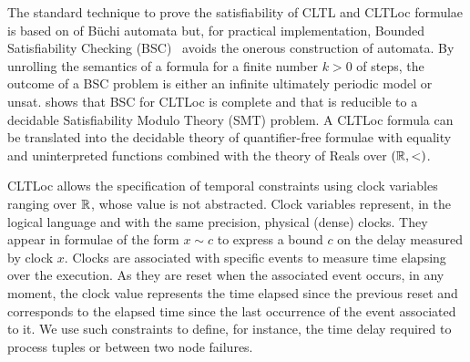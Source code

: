 The standard technique to prove the satisfiability of CLTL and CLTLoc formulae is based on of B\"uchi automata \cite{DD07,BRS15} %
but, for practical implementation, Bounded Satisfiability Checking (BSC)~\cite{MPS13} avoids the onerous construction of automata.
By unrolling the semantics of a formula for a finite number $k>0$ of steps, 
the outcome of a BSC problem is either an infinite ultimately periodic model or unsat.
\cite{BRS15} shows that BSC for CLTLoc is complete and that is reducible to a decidable Satisfiability Modulo Theory (SMT) problem. 
A CLTLoc formula can be translated into the decidable theory of quantifier-free formulae with equality and uninterpreted functions combined with the theory of Reals over $(\mathbb{R},<)$. %

CLTLoc allows the specification of temporal constraints using clock variables ranging over $\mathbb{R}$, whose value is not abstracted.
Clock variables represent, in the logical language and with the same precision, physical (dense) clocks.
They appear in formulae of the form $x \sim c$ to express a bound $c$ on the delay measured by clock $x$. 
Clocks are associated with specific events to measure time elapsing over the execution.
As they are reset when the associated event occurs, in any moment, the clock value represents the time elapsed since the previous reset and corresponds to the elapsed time since the last occurrence of the event associated to it.
We use such constraints to define, for instance, the time delay required to process tuples or between two node failures.


